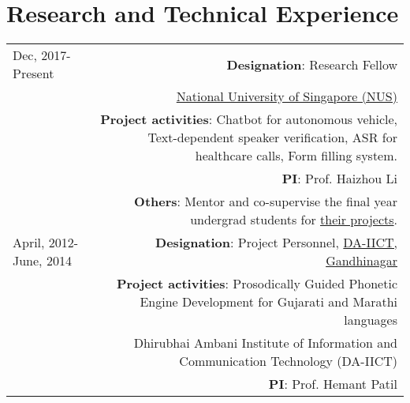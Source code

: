 \documentclass[10pt]{article}
\begin{document}
\section*{Research and Technical Experience}
\begin{tabular}{L!{\VRule}R}
	Dec, 2017-Present&\textbf{Designation}: Research Fellow \\
	& \href{http://ece.nus.edu.sg/hlt/maulik/}{National University of Singapore (NUS)}\\
	&\textbf{Project activities}:  Chatbot for autonomous vehicle, Text-dependent speaker verification, ASR for healthcare calls, Form filling system.\\
	&\textbf{PI}: Prof. Haizhou Li \vspace{0.3cm}\\
	&\textbf{Others}: Mentor and co-supervise the final year undergrad students for \href{https://drive.google.com/drive/folders/1XS0ttBsnD0YT5Y_pZ_QEw_XN3gmKMIOT}{their projects}.
	
	\\
	April, 2012-June, 2014&\textbf{Designation}: Project Personnel, \href{https://sites.google.com/site/speechlabdaiict/projects/prosodically-guided-phonetic-engine-development}{DA-IICT, Gandhinagar} \\
	&\textbf{Project activities}: Prosodically Guided Phonetic Engine Development
	for Gujarati and Marathi languages \\
	& Dhirubhai Ambani Institute of Information and Communication Technology (DA-IICT)\\
	&\textbf{PI}: Prof. Hemant Patil\\
	
	
\end{tabular}
\end{document}
